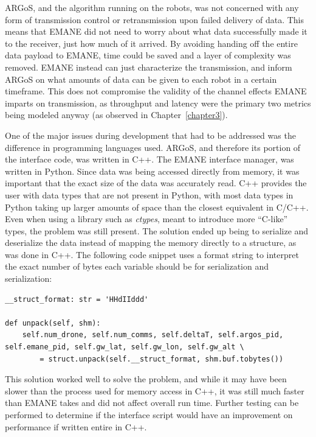 ARGoS, and the algorithm running on the robots, was not concerned with any form of transmission control or retransmission upon failed delivery of data.
This means that EMANE did not need to worry about what data successfully made it to the receiver, just how much of it arrived.
By avoiding handing off the entire data payload to EMANE, time could be saved and a layer of complexity was removed.
EMANE instead can just characterize the transmission, and inform ARGoS on what amounts of data can be given to each robot in a certain timeframe.
This does not compromise the validity of the channel effects EMANE imparts on transmission, as throughput and latency were the primary two metrics being modeled anyway (as observed in Chapter~\ref{chapter3}).\par
One of the major issues during development that had to be addressed was the difference in programming languages used.
ARGoS, and therefore its portion of the interface code, was written in C++.
The EMANE interface manager, was written in Python.
Since data was being accessed directly from memory, it was important that the exact size of the data was accurately read.
C++ provides the user with data types that are not present in Python, with most data types in Python taking up larger amounts of space than the closest equivalent in C/C++.
Even when using a library such as \textit{ctypes}, meant to introduce more ``C-like'' types, the problem was still present.
The solution ended up being to serialize and deserialize the data instead of mapping the memory directly to a structure, as was done in C++.
The following code snippet uses a format string to interpret the exact number of bytes each variable should be for serialization and serialization:
\begin{verbatim}
__struct_format: str = 'HHdIIddd'

def unpack(self, shm):
	self.num_drone, self.num_comms, self.deltaT, self.argos_pid, self.emane_pid, self.gw_lat, self.gw_lon, self.gw_alt \
		= struct.unpack(self.__struct_format, shm.buf.tobytes())
\end{verbatim}
This solution worked well to solve the problem, and while it may have been slower than the process used for memory access in C++, it was still much faster than EMANE takes and did not affect overall run time.
Further testing can be performed to determine if the interface script would have an improvement on performance if written entire in C++.


